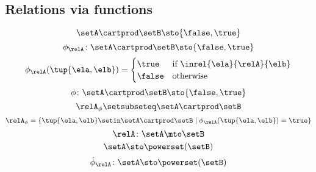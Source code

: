 \begin{forslides}
    \subsection{Relations via functions}

    \begin{equation}\label{eq:slides_session2_rel_110}
        \setA \cartprod \setB \sto \{ \false, \true \}
    \end{equation}
    \begin{equation}\label{eq:slides_session2_rel_111}
        \phi_{\relA} \colon \setA \cartprod \setB \sto \{ \false, \true \}
    \end{equation}
    \begin{equation}\label{eq:slides_session2_rel_112}
        \phi_{\relA}(\tup{\ela, \elb}) =
        \begin{cases}
            \true  & \text{if } \inrel{\ela}{\relA}{\elb} \\
            \false & \text{otherwise}
        \end{cases}
    \end{equation}
    \begin{equation}\label{eq:slides_session2_rel_113}
        \phi\colon \setA \cartprod \setB \sto \{ \false, \true \}
    \end{equation}
    \begin{equation}\label{eq:slides_session2_rel_114}
        \relA_{\phi} \setsubseteq \setA \cartprod \setB
    \end{equation}
    \begin{equation}\label{eq:slides_session2_rel_115}
        \relA_{\phi} = \{ \tup{\ela, \elb} \setin \setA \cartprod \setB \mid \phi_{\relA}(\tup{\ela, \elb}) = \true \}
    \end{equation}
    \begin{equation}\label{eq:slides_session2_rel_116}
        \relA \colon \setA \mto \setB
    \end{equation}
    \begin{equation}\label{eq:slides_session2_rel_117}
        \setA  \sto \powerset (\setB)
    \end{equation}
    \begin{equation}\label{eq:slides_session2_rel_118}
        \hat \phi_{\relA} \colon \setA \sto \powerset (\setB)
    \end{equation}
    \begin{equation}\label{eq:slides_session2_rel_119}

\end{equation}
\end{forslides}
